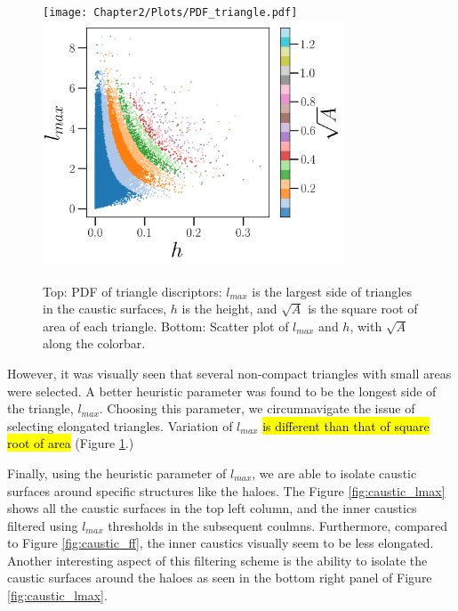 \begin{figure} 
\centering\texttt{[image: Chapter2/Plots/PDF\_triangle.pdf]} 
\centering\includegraphics[width=9cm]{Chapter2/Plots/Scatter_Al_ff.png} 
\caption{Top: PDF of triangle discriptors: $l_{max}$ is the largest side of triangles in the caustic surfaces, $h$ is the height, and $\sqrt{A}$ is the square root of area of each triangle. Bottom: Scatter plot of $l_{max}$ and $h$, with $\sqrt{A}$ along the colorbar. }
\label{fig:PDF_lmax}
\end{figure}

However, it was visually seen that several non-compact triangles with small areas were selected. A better heuristic parameter was found to be the longest side of the triangle, $l_{max}$. Choosing this parameter, we circumnavigate the issue of selecting elongated triangles. Variation of $l_{max}$ \hl{is different than that of square root of area} (Figure \ref{fig:PDF_lmax}.)

Finally, using the heuristic parameter of $l_{max}$, we are able to isolate caustic surfaces around specific structures like the haloes. The Figure \ref{fig:caustic_lmax} shows all the caustic surfaces in the top left column, and the inner caustics filtered using $l_{max}$ thresholds in the subsequent coulmns. Furthermore, compared to Figure \ref{fig:caustic_ff}, the inner caustics visually seem to be less elongated. Another interesting aspect of this filtering scheme is the ability to isolate the caustic surfaces around the haloes as seen in the bottom right panel of Figure \ref{fig:caustic_lmax}. 

